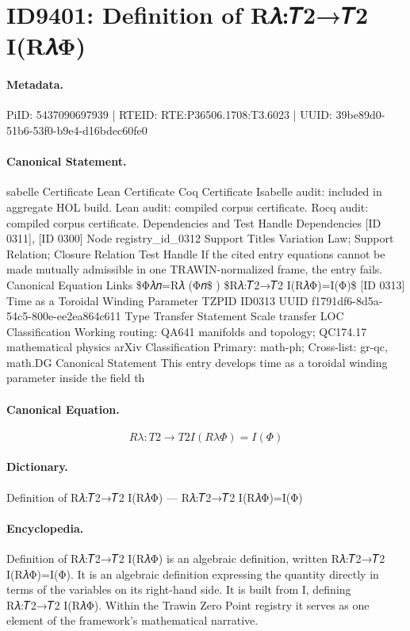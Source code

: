\section*{ID9401: Definition of R𝜆:𝑇2→𝑇2 I(R𝜆Φ)}
\paragraph{Metadata.}
PiID: 5437090697939 | RTEID: RTE:P36506.1708:T3.6023 | UUID: 39be89d0-51b6-53f0-b9e4-d16bdec60fe0

\paragraph{Canonical Statement.}
sabelle Certificate Lean Certificate Coq Certificate Isabelle audit: included in aggregate HOL build. Lean audit: compiled corpus certificate. Rocq audit: compiled corpus certificate. Dependencies and Test Handle Dependencies [ID 0311], [ID 0300] Node registry\_id\_0312 Support Titles Variation Law; Support Relation; Closure Relation Test Handle If the cited entry equations cannot be made mutually admissible in one TRAWIN-normalized frame, the entry fails. Canonical Equation Links \$Φ𝜆𝑛=R𝜆 (Φ𝑛\$ ) \$R𝜆:𝑇2→𝑇2 I(R𝜆Φ)=I(Φ)\$ [ID 0313] Time as a Toroidal Winding Parameter TZPID ID0313 UUID f1791df6-8d5a-54c5-800e-ee2ea864c611 Type Transfer Statement Scale transfer LOC Classification Working routing: QA641 manifolds and topology; QC174.17 mathematical physics arXiv Classification Primary: math-ph; Cross-list: gr-qc, math.DG Canonical Statement This entry develops time as a toroidal winding parameter inside the field th

\paragraph{Canonical Equation.}
\[
R𝜆:𝑇2→𝑇2 I(R𝜆Φ)=I(Φ)
\]

\paragraph{Dictionary.}
Definition of R𝜆:𝑇2→𝑇2 I(R𝜆Φ) — R𝜆:𝑇2→𝑇2 I(R𝜆Φ)=I(Φ)

\paragraph{Encyclopedia.}
Definition of R𝜆:𝑇2→𝑇2 I(R𝜆Φ) is an algebraic definition, written R𝜆:𝑇2→𝑇2 I(R𝜆Φ)=I(Φ). It is an algebraic definition expressing the quantity directly in terms of the variables on its right-hand side. It is built from I, defining R𝜆:𝑇2→𝑇2 I(R𝜆Φ). Within the Trawin Zero Point registry it serves as one element of the framework's mathematical narrative.

